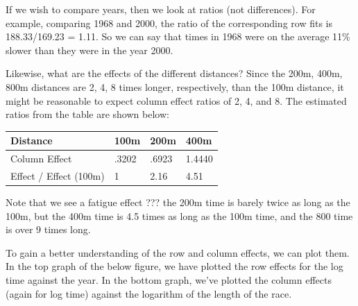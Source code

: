 \documentclass[
]{book}
\newenvironment{Shaded}{\begin{snugshade}}{\end{snugshade}}
\newcommand{\AttributeTok}[1]{\textcolor[rgb]{0.77,0.63,0.00}{#1}}
\newcommand{\DecValTok}[1]{\textcolor[rgb]{0.00,0.00,0.81}{#1}}
\newcommand{\FunctionTok}[1]{\textcolor[rgb]{0.00,0.00,0.00}{#1}}
\newcommand{\NormalTok}[1]{#1}
\newcommand{\OtherTok}[1]{\textcolor[rgb]{0.56,0.35,0.01}{#1}}
\newcommand{\SpecialCharTok}[1]{\textcolor[rgb]{0.00,0.00,0.00}{#1}}
\begin{document}
If we wish to compare years, then we look at ratios (not differences). For example, comparing 1968 and 2000, the ratio of the corresponding row fits is 188.33/169.23 = 1.11. So we can say that times in 1968 were on the average 11\% slower than they were in the year 2000.

Likewise, what are the effects of the different distances? Since the 200m, 400m, 800m distances are 2, 4, 8 times longer, respectively, than the 100m distance, it might be reasonable to expect column effect ratios of 2, 4, and 8. The estimated ratios from the table are shown below:

\begin{longtable}[]{@{}llll@{}}
\toprule
Distance & 100m & 200m & 400m \\
\midrule
\endhead
Column Effect & .3202 & .6923 & 1.4440 \\
Effect / Effect (100m) & 1 & 2.16 & 4.51 \\
\bottomrule
\end{longtable}

Note that we see a fatigue effect ??? the 200m time is barely twice as long as the 100m, but the 400m time is 4.5 times as long as the 100m time, and the 800 time is over 9 times long.

To gain a better understanding of the row and column effects, we can plot them. In the top graph of the below figure, we have plotted the row effects for the log time against the year. In the bottom graph, we've plotted the column effects (again for log time) against the logarithm of the length of the race.

\begin{Shaded}
\end{Shaded}
\end{document}
